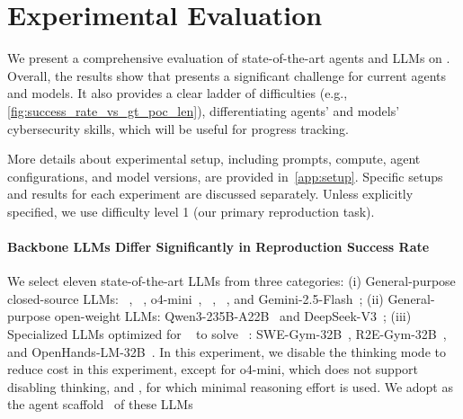 \section{Experimental Evaluation}
\label{sec:eval}
We present a comprehensive evaluation of state-of-the-art agents and LLMs on \sysname{}.
Overall, the results show that \sysname presents a significant challenge for current agents and models.
It also provides a clear ladder of difficulties (e.g., \cref{fig:success_rate_vs_gt_poc_len}), differentiating agents' and models' cybersecurity skills, which will be useful for progress tracking.

More details about experimental setup, including prompts, compute, agent configurations, and model versions, are provided in~\cref{app:setup}.
Specific setups and results for each experiment are discussed separately.
Unless explicitly specified, we use difficulty level 1 (our primary reproduction task).

\paragraph{Backbone LLMs Differ Significantly in Reproduction Success Rate}
We select eleven state-of-the-art LLMs from three categories: (i) General-purpose closed-source LLMs: \gptiv{}~\citep{openai_gpt4.1}, \gptv{}~\citep{openai_gpt5}, o4-mini~\citep{openai_o3_o4mini}, \claudeiii{}~\citep{claude37sonnet}, \claudeiv{}~\citep{claudesonnet4}, and Gemini-2.5-Flash~\citep{gemini25flash}; (ii) General-purpose open-weight LLMs: Qwen3-235B-A22B~\citep{qwen3} and DeepSeek-V3~\citep{deepseekv3}; (iii) Specialized LLMs optimized for \openhands~\citep{openhands} to solve \swebench{}~\citep{jimenez2024swebench}: SWE-Gym-32B~\citep{swegym}, R2E-Gym-32B~\citep{r2egym}, and OpenHands-LM-32B~\citep{openhands_lm32b}.
In this experiment, we disable the thinking mode to reduce cost in this experiment, except for o4-mini, which does not support disabling thinking, and \gptv{}, for which minimal reasoning effort is used.
We adopt \openhands{} as the agent scaffold~\citep{openhands} of these LLMs

